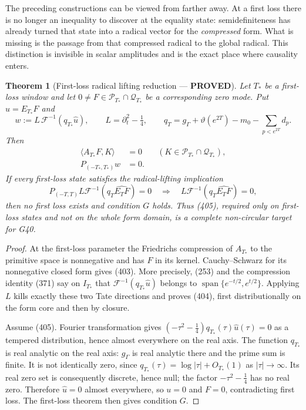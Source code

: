\documentclass[11pt]{article}
\newtheorem{theorem}{Theorem}
\newcommand{\PROVED}{\textcolor{green!45!black}{\textbf{PROVED}}}
\begin{document}
The preceding constructions can be viewed from farther away.  At a first
loss there is no longer an inequality to discover at the equality state:
semidefiniteness has already turned that state into a radical vector for the
\emph{compressed} form.  What is missing is the passage from that compressed
radical to the global radical.  This distinction is invisible in scalar
amplitudes and is the exact place where causality enters.

\begin{theorem}[First-loss radical lifting reduction --- \PROVED]
Let $T_*$ be a first-loss window and let $0\ne F\in\mathcal P_{T_*}\cap
\mathcal Q_{T_*}$ be a corresponding zero mode.  Put $u=E_{T_*}F$ and
\begin{equation}
 w:=L\,\mathcal F^{-1}\!\left(q_{T_*}\widehat u\right),
 \qquad L=\partial_t^2-\tfrac14,
 \qquad
 q_T=g_\Gamma+\vartheta(e^{2T})-m_0
             -\sum_{p<e^{2T}}d_p .                  \tag{402}
\end{equation}
Then
\begin{align}
 \langle A_{T_*}F,K\rangle&=0
       &&(K\in\mathcal P_{T_*}\cap\mathcal Q_{T_*}),\tag{403}\\
 P_{(-T_*,T_*)}w&=0.                                 \tag{404}
\end{align}
If every first-loss state satisfies the radical-lifting implication
\begin{equation}
 P_{(-T,T)}L\mathcal F^{-1}(q_T\widehat{E_TF})=0
 \quad\Longrightarrow\quad
 L\mathcal F^{-1}(q_T\widehat{E_TF})=0,              \tag{405}
\end{equation}
then no first loss exists and condition $G$ holds.  Thus (405), required
only on first-loss states and not on the whole form domain, is a complete
non-circular target for G40.
\end{theorem}

\begin{proof}
At the first-loss parameter the Friedrichs compression of $A_{T_*}$ to the
primitive space is nonnegative and has $F$ in its kernel.  Cauchy--Schwarz
for its nonnegative closed form gives (403).  More precisely, (253) and the
compression identity (371) say on $I_{T_*}$ that
$\mathcal F^{-1}(q_{T_*}\widehat u)$ belongs to
$\operatorname{span}\{e^{-t/2},e^{t/2}\}$.  Applying $L$ kills exactly
these two Tate directions and proves (404), first distributionally on the
form core and then by closure.

Assume (405).  Fourier transformation gives
$(-\tau^2-\tfrac14)q_{T_*}(\tau)\widehat u(\tau)=0$ as a tempered
distribution, hence almost everywhere on the real axis.  The function
$q_{T_*}$ is real analytic on the real axis: $g_\Gamma$ is real analytic
there and the prime sum is finite.  It is not identically zero, since
$q_{T_*}(\tau)=\log|\tau|+O_{T_*}(1)$ as $|\tau|\to\infty$.  Its real zero
set is consequently discrete, hence null; the factor
$-\tau^2-\tfrac14$ has no real zero.  Therefore $\widehat u=0$ almost
everywhere, so $u=0$ and $F=0$, contradicting first loss.  The first-loss
theorem then gives condition $G$.
\end{proof}
\end{document}
